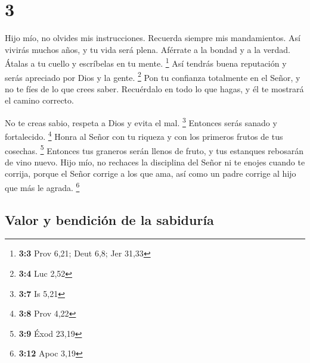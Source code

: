 \hypertarget{section-2}{%
\section{3}\label{section-2}}

 Hijo mío, no olvides mis instrucciones. Recuerda siempre
mis mandamientos.  Así vivirás muchos años, y tu vida será
plena.  Aférrate a la bondad y a la verdad. Átalas a tu
cuello y escríbelas en tu mente. \footnote{\textbf{3:3} Prov 6,21; Deut
  6,8; Jer 31,33}  Así tendrás buena reputación y serás
apreciado por Dios y la gente. \footnote{\textbf{3:4} Luc 2,52}
 Pon tu confianza totalmente en el Señor, y no te fíes de lo
que crees saber.  Recuérdalo en todo lo que hagas, y él te
mostrará el camino correcto.

 No te creas sabio, respeta a Dios y evita el mal.
\footnote{\textbf{3:7} Is 5,21}  Entonces serás sanado y
fortalecido. \footnote{\textbf{3:8} Prov 4,22}  Honra al
Señor con tu riqueza y con los primeros frutos de tus cosechas.
\footnote{\textbf{3:9} Éxod 23,19}  Entonces tus graneros
serán llenos de fruto, y tus estanques rebosarán de vino nuevo.
 Hijo mío, no rechaces la disciplina del Señor ni te enojes
cuando te corrija,  porque el Señor corrige a los que ama,
así como un padre corrige al hijo que más le agrada. \footnote{\textbf{3:12}
  Apoc 3,19}

\hypertarget{valor-y-bendiciuxf3n-de-la-sabiduruxeda}{%
\subsection{Valor y bendición de la
sabiduría}\label{valor-y-bendiciuxf3n-de-la-sabiduruxeda}}

